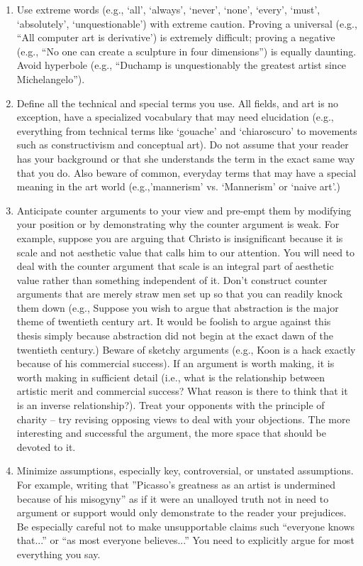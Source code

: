 \begin{multicols}{2}
\begin{enumerate}
\item    Use extreme words (e.g., ‘all’, ‘always’, ‘never’, ‘none’, ‘every’, ‘must’, ‘absolutely’, ‘unquestionable’) with extreme caution. Proving a universal (e.g., “All computer art is derivative’) is extremely difficult; proving a negative (e.g., “No one can create a sculpture in four dimensions”) is equally daunting. Avoid hyperbole (e.g., “Duchamp is unquestionably the greatest artist since Michelangelo”).
\item  Define all the technical and special terms you use. All fields, and art is no exception, have a specialized vocabulary that may need elucidation (e.g., everything from technical terms like ‘gouache’ and ‘chiaroscuro’ to movements such as constructivism and conceptual art). Do not assume that your reader has your background or that she understands the term in the exact same way that you do. Also beware of common, everyday terms that may have a special meaning in the art world (e.g.,’mannerism’ vs. ‘Mannerism’ or ‘naive art’.)
\item  Anticipate counter arguments to your view and pre-empt them by modifying your position or by demonstrating why the counter argument is weak. For example, suppose you are arguing that Christo is insignificant because it is scale and not aesthetic value that calls him to our attention. You will need to deal with the counter argument that scale is an integral part of aesthetic value rather than something independent of it. Don’t construct counter arguments that are merely straw men set up so that you can readily knock them down (e.g., Suppose you wish to argue that abstraction is the major theme of twentieth century art. It would be foolish to argue against this thesis simply because abstraction did not begin at the exact dawn of the twentieth century.) Beware of sketchy arguments (e.g., Koon is a hack exactly because of his commercial success). If an argument is worth making, it is worth making in sufficient detail (i.e., what is the relationship between artistic merit and commercial success? What reason is there to think that it is an inverse relationship?). Treat your opponents with the principle of charity -- try revising opposing views to deal with your objections. The more interesting and successful the argument, the more space that should be devoted to it.
\item    Minimize assumptions, especially key, controversial, or unstated assumptions. For example, writing that ”Picasso’s greatness as an artist is undermined because of his misogyny” as if it were an unalloyed truth not in need to argument or support would only demonstrate to the reader your prejudices. Be especially careful not to make unsupportable claims such “everyone knows that...” or “as most everyone believes...” You need to explicitly argue for most everything you say.

\end{enumerate}
\end{multicols}

